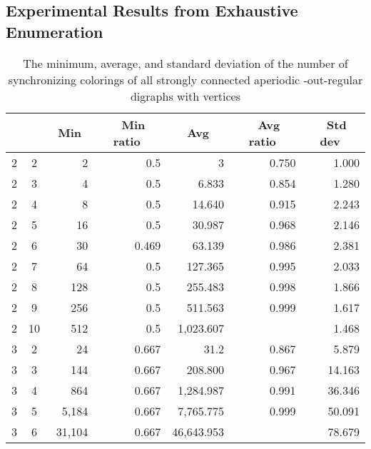 \documentclass[runningheads]{llncs}
\begin{document}
\subsection{Experimental Results from Exhaustive Enumeration}

\begin{table}
\caption{The minimum, average, and standard deviation of the number of synchronizing colorings of all strongly connected aperiodic -out-regular digraphs with  vertices}
\label{tab:exhaustive_results_1}
\begin{center}
\begin{tabular}{|c|c|r|r|r|r|r|}
  \hline
  &&\multicolumn{1}{c|}{\ Min\ }&\multicolumn{1}{c|}{\ Min ratio\ }&\multicolumn{1}{c|}{\ Avg\ }& \multicolumn{1}{c|}{\ Avg ratio\ } &\multicolumn{1}{c|}{\ Std dev\ } \\ \hline\hline
  2 & 2  &  2         & 0.5       & 3               & 0.750           & 1.000  \\ \hline  
  2 & 3  &  4         & 0.5       & 6.833           & 0.854           & 1.280  \\ \hline
  2 & 4  &  8         & 0.5       & 14.640          & 0.915           & 2.243  \\ \hline  
  2 & 5  &  16        & 0.5       & 30.987          & 0.968           & 2.146  \\ \hline  
  2 & 6  &  30        & 0.469     & 63.139          & 0.986           & 2.381  \\ \hline
  2 & 7  &  64        & 0.5       & 127.365         & 0.995           & 2.033  \\ \hline  
  2 & 8  &  128       & 0.5       & 255.483         & 0.998           & 1.866  \\ \hline  
  2 & 9  &  256       & 0.5       & 511.563         & 0.999           & 1.617  \\ \hline  
  2 & 10 &  512       & 0.5       & 1,023.607       &  & 1.468  \\ \hline
  3 & 2  &   24       & 0.667     & 31.2            & 0.867           & 5.879  \\ \hline 
  3 & 3  &  144       & 0.667     & 208.800         & 0.967           & 14.163  \\ \hline 
  3 & 4  &  864       & 0.667     & 1,284.987       & 0.991           & 36.346  \\ \hline 
  3 & 5  & 5,184      & 0.667     & 7,765.775       & 0.999           & 50.091  \\ \hline 
  3 & 6  & 31,104     & 0.667     & 46,643.953      &  & 78.679  \\ \hline 

\end{tabular}
\end{center}
\end{table}
\end{document}
